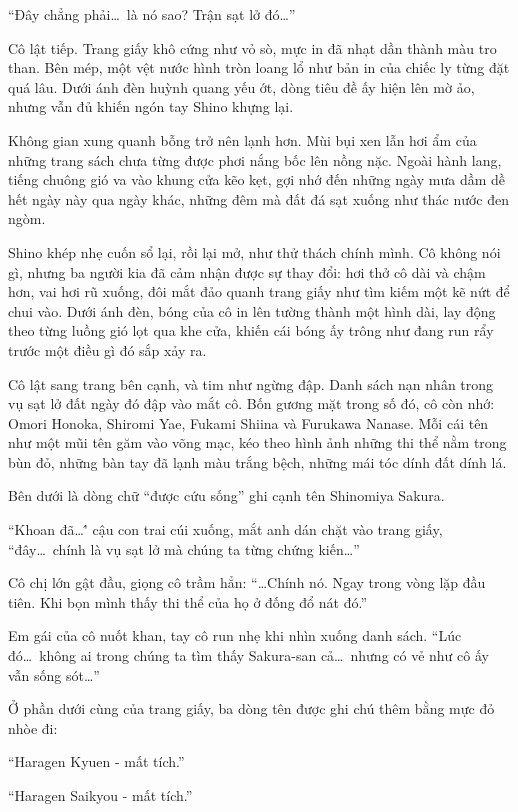 \documentclass[../main.tex]{subfiles}
\begin{document}
``Đây chẳng phải\dots\ là nó sao? Trận sạt lở đó\dots''


Cô lật tiếp. Trang giấy khô cứng như vỏ sò, mực in đã nhạt dần thành màu tro than. Bên mép, một vệt nước hình tròn loang lổ như bản in của chiếc ly từng đặt quá lâu. Dưới ánh đèn huỳnh quang yếu ớt, dòng tiêu đề ấy hiện lên mờ ảo, nhưng vẫn đủ khiến ngón tay Shino khựng lại.

Không gian xung quanh bỗng trở nên lạnh hơn. Mùi bụi xen lẫn hơi ẩm của những trang sách chưa từng được phơi nắng bốc lên nồng nặc. Ngoài hành lang, tiếng chuông gió va vào khung cửa kẽo kẹt, gợi nhớ đến những ngày mưa dầm dề hết ngày này qua ngày khác, những đêm mà đất đá sạt xuống như thác nước đen ngòm.

Shino khép nhẹ cuốn sổ lại, rồi lại mở, như thử thách chính mình. Cô không nói gì, nhưng ba người kia đã cảm nhận được sự thay đổi: hơi thở cô dài và chậm hơn, vai hơi rũ xuống, đôi mắt đảo quanh trang giấy như tìm kiếm một kẽ nứt để chui vào. Dưới ánh đèn, bóng của cô in lên tường thành một hình dài, lay động theo từng luồng gió lọt qua khe cửa, khiến cái bóng ấy trông như đang run rẩy trước một điều gì đó sắp xảy ra.

Cô lật sang trang bên cạnh, và tim như ngừng đập.
Danh sách nạn nhân trong vụ sạt lở đất ngày đó đập vào mắt cô. Bốn gương mặt trong số đó, cô còn nhớ: Omori Honoka, Shiromi Yae, Fukami Shiina và Furukawa Nanase. Mỗi cái tên như một mũi tên găm vào võng mạc, kéo theo hình ảnh những thi thể nằm trong bùn đỏ, những bàn tay đã lạnh màu trắng bệch, những mái tóc dính đất dính lá.

Bên dưới là dòng chữ ``được cứu sống'' ghi cạnh tên Shinomiya Sakura.

``Khoan đã\dots\'' cậu con trai cúi xuống, mắt anh dán chặt vào trang giấy, ``đây\dots\ chính là vụ sạt lở mà chúng ta từng chứng kiến\dots''

Cô chị lớn gật đầu, giọng cô trầm hẳn: ``\dots Chính nó. Ngay trong vòng lặp đầu tiên. Khi bọn mình thấy thi thể của họ ở đống đổ nát đó.''

Em gái của cô nuốt khan, tay cô run nhẹ khi nhìn xuống danh sách. ``Lúc đó\dots\ không ai trong chúng ta tìm thấy Sakura-san cả\dots\ nhưng có vẻ như cô ấy vẫn sống sót\dots''

Ở phần dưới cùng của trang giấy, ba dòng tên được ghi chú thêm bằng mực đỏ nhòe đi:

``Haragen Kyuen - mất tích.''

``Haragen Saikyou - mất tích.''
\end{document}
